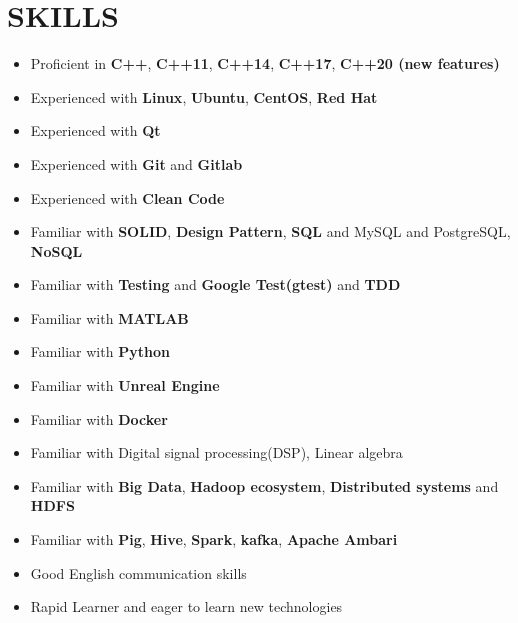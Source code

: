 \documentclass[11pt,a4paper,roman]{moderncv}
\begin{document}
{{\section{SKILLS}
\begin{minipage}{\maincolumnwidth}%
  \small{
      \begin{itemize}
	  \item Proficient  in \textbf{C++}, \textbf{C++11}, \textbf{C++14}, \textbf{C++17}, \textbf{C++20 (new features)}
          \item Experienced with \textbf{Linux}, \textbf{Ubuntu}, \textbf{CentOS}, \textbf{Red Hat}
          \item Experienced with \textbf{Qt}
          \item Experienced with \textbf{Git} and \textbf{Gitlab}
	  \item Experienced with \textbf{Clean Code}
	  \item Familiar with \textbf{SOLID}, \textbf{Design Pattern}, \textbf{SQL} and MySQL and PostgreSQL, \textbf{NoSQL}
	  \item Familiar with \textbf{Testing} and \textbf{Google Test(gtest)} and \textbf{TDD}
	  \item Familiar with \textbf{MATLAB}
	  \item Familiar with \textbf{Python}
	  \item Familiar with \textbf{Unreal Engine}
	  \item Familiar with \textbf{Docker}
	  \item Familiar with Digital signal processing(DSP), Linear algebra
	  \item Familiar with \textbf{Big Data}, \textbf{Hadoop ecosystem}, \textbf{Distributed systems} and \textbf{HDFS}
	  \item Familiar with \textbf{Pig}, \textbf{Hive}, \textbf{Spark}, \textbf{kafka}, \textbf{Apache Ambari}
          \item Good English communication skills
          \item Rapid Learner and eager to learn new technologies
    \end{itemize}}%
\end{minipage}%
      
}

}

\nocite{*}

 
\end{document}
